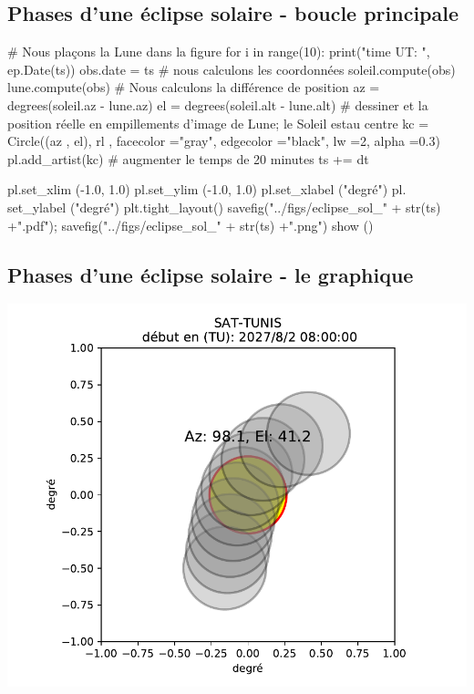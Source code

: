 \documentclass[%
oneside,                 %
final,                   %
10pt]{article}
\begin{document}
\subsection{Phases d'une éclipse solaire - boucle principale}

\bpycod
# Nous plaçons la Lune dans la figure
for i in range(10):
    print("time UT: ", ep.Date(ts))
    obs.date = ts
    # nous calculons les coordonnées
    soleil.compute(obs)
    lune.compute(obs)
    # Nous calculons la différence de position
    az = degrees(soleil.az - lune.az)
    el = degrees(soleil.alt - lune.alt)
    # dessiner et la position réelle en empillements d'image de Lune; le Soleil estau centre
    kc = Circle((az , el), rl , facecolor ="gray",
                edgecolor ="black", lw =2, alpha =0.3)
    pl.add_artist(kc)
    # augmenter le temps de 20 minutes
    ts += dt

pl.set_xlim (-1.0, 1.0)
pl.set_ylim (-1.0, 1.0)
pl.set_xlabel ("degré")
pl. set_ylabel ("degré")
plt.tight_layout()
savefig("../figs/eclipse_sol_" + str(ts) +".pdf"); savefig("../figs/eclipse_sol_" + str(ts) +".png")
show ()
\epycod

\subsection{Phases d'une éclipse solaire - le graphique}


\vspace{6mm}

\centerline{\includegraphics[width=0.9\linewidth]{figs/eclipse_sol.pdf}}
\end{document}

